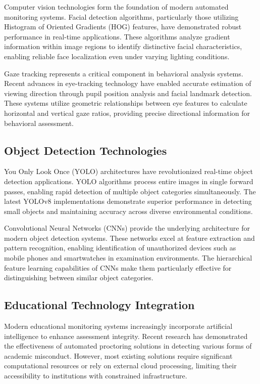 \documentclass[conference]{IEEEtran}
\begin{document}
Computer vision technologies form the foundation of modern automated monitoring systems. Facial detection algorithms, particularly those utilizing Histogram of Oriented Gradients (HOG) features, have demonstrated robust performance in real-time applications\cite{hasan2021face}. These algorithms analyze gradient information within image regions to identify distinctive facial characteristics, enabling reliable face localization even under varying lighting conditions.

Gaze tracking represents a critical component in behavioral analysis systems. Recent advances in eye-tracking technology have enabled accurate estimation of viewing direction through pupil position analysis and facial landmark detection\cite{dilini2021cheating}. These systems utilize geometric relationships between eye features to calculate horizontal and vertical gaze ratios, providing precise directional information for behavioral assessment\cite{el2023drowsiness}.

\subsection{Object Detection Technologies}

You Only Look Once (YOLO) architectures have revolutionized real-time object detection applications. YOLO algorithms process entire images in single forward passes, enabling rapid detection of multiple object categories simultaneously\cite{wang2022object}. The latest YOLOv8 implementations demonstrate superior performance in detecting small objects and maintaining accuracy across diverse environmental conditions\cite{v7labs2023yolo}.

Convolutional Neural Networks (CNNs) provide the underlying architecture for modern object detection systems\cite{goodfellow2016deep}. These networks excel at feature extraction and pattern recognition, enabling identification of unauthorized devices such as mobile phones and smartwatches in examination environments. The hierarchical feature learning capabilities of CNNs make them particularly effective for distinguishing between similar object categories\cite{pytorch}.

\subsection{Educational Technology Integration}

Modern educational monitoring systems increasingly incorporate artificial intelligence to enhance assessment integrity\cite{russell2020artificial}. Recent research has demonstrated the effectiveness of automated proctoring solutions in detecting various forms of academic misconduct\cite{honorlock2023detecting}. However, most existing solutions require significant computational resources or rely on external cloud processing, limiting their accessibility to institutions with constrained infrastructure.
\end{document}
